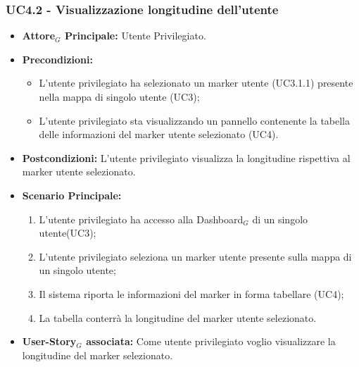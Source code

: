 \documentclass[11pt]{article}
\begin{document}
\begin{justify}
\subsubsection{\textbf{UC4.2 - Visualizzazione longitudine dell'utente}}
\label{UC4.2}
\begin{itemize}
     \item \textbf{Attore$_G$ Principale:} Utente Privilegiato.
     \item \textbf{Precondizioni:}
        \begin{itemize}
          \item L'utente privilegiato ha selezionato un marker utente (UC3.1.1) presente nella mappa di singolo utente (UC3);
          \item L'utente privilegiato sta visualizzando un pannello contenente la tabella delle informazioni del marker utente selezionato (UC4).
        \end{itemize}
      \item \textbf{Postcondizioni:} L'utente privilegiato visualizza la longitudine rispettiva al marker utente selezionato. 
      \item \textbf{Scenario Principale:}
        \begin{enumerate}
            \item L'utente privilegiato ha accesso alla Dashboard$_G$ di un singolo utente(UC3);
            \item L'utente privilegiato seleziona un marker utente presente sulla mappa di un singolo utente;
            \item Il sistema riporta le informazioni del marker in forma tabellare (UC4);
            \item La tabella conterrà la longitudine del marker utente selezionato.
        \end{enumerate}
     \item \textbf{User-Story$_G$ associata:}
       Come utente privilegiato voglio visualizzare la longitudine del marker selezionato.
\end{itemize}


\end{justify}
\end{document}
